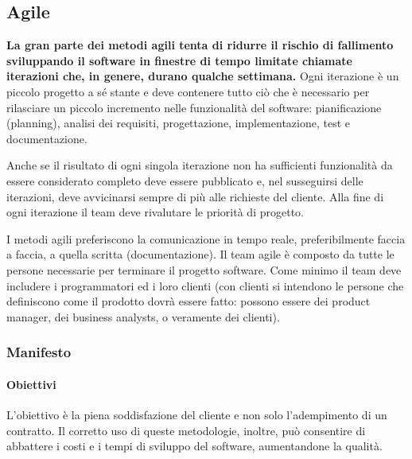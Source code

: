 \documentclass[11pt,a4paper]{book}
\begin{document}
\subsection{Agile}
\textbf{La gran parte dei metodi agili tenta di ridurre il rischio di fallimento sviluppando il software in finestre di tempo limitate chiamate iterazioni che, in genere, durano qualche settimana.} Ogni iterazione è un piccolo progetto a sé stante e deve contenere tutto ciò che è necessario per rilasciare un piccolo incremento nelle funzionalità del software: pianificazione (planning), analisi dei requisiti, progettazione, implementazione, test e documentazione.

Anche se il risultato di ogni singola iterazione non ha sufficienti funzionalità da essere considerato completo deve essere pubblicato e, nel susseguirsi delle iterazioni, deve avvicinarsi sempre di più alle richieste del cliente. Alla fine di ogni iterazione il team deve rivalutare le priorità di progetto.

I metodi agili preferiscono la comunicazione in tempo reale, preferibilmente faccia a faccia, a quella scritta (documentazione). Il team agile è composto da tutte le persone necessarie per terminare il progetto software. Come minimo il team deve includere i programmatori ed i loro clienti (con clienti si intendono le persone che definiscono come il prodotto dovrà essere fatto: possono essere dei product manager, dei business analysts, o veramente dei clienti).

\subsubsection{Manifesto}
\paragraph{Obiettivi}
L'obiettivo è la piena soddisfazione del cliente e non solo l'adempimento di un contratto. Il corretto uso di queste metodologie, inoltre, può consentire di abbattere i costi e i tempi di sviluppo del software, aumentandone la qualità.
\end{document}
